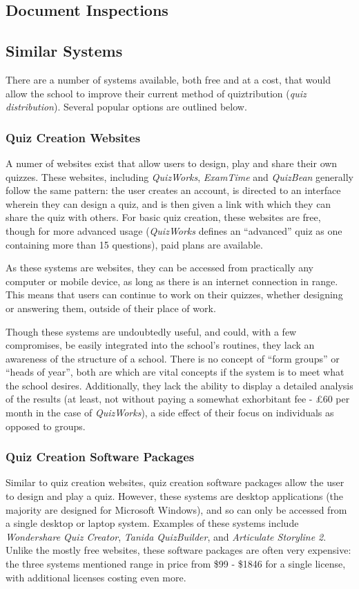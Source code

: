 \subsection{Document Inspections}

\subsection{Similar Systems}
There are a number of systems available, both free and at a cost, that would allow the school to improve their current method of quiztribution (\textit{quiz distribution}). Several popular options are outlined below.

\subsubsection{Quiz Creation Websites}
A numer of websites exist that allow users to design, play and share their own quizzes. These websites, including \textit{QuizWorks}, \textit{ExamTime} and \textit{QuizBean} generally follow the same pattern: the user creates an account, is directed to an interface wherein they can design a quiz, and is then given a link with which they can share the quiz with others. For basic quiz creation, these websites are free, though for more advanced usage (\textit{QuizWorks} defines an ``advanced'' quiz as one containing more than 15 questions), paid plans are available.

As these systems are websites, they can be accessed from practically any computer or mobile device, as long as there is an internet connection in range. This means that users can continue to work on their quizzes, whether designing or answering them, outside of their place of work.

Though these systems are undoubtedly useful, and could, with a few compromises, be easily integrated into the school's routines, they lack an awareness of the structure of a school. There is no concept of ``form groups'' or ``heads of year'', both are which are vital concepts if the system is to meet what the school desires. Additionally, they lack the ability to display a detailed analysis of the results (at least, not without paying a somewhat exhorbitant fee - \pounds60 per month in the case of \textit{QuizWorks}), a side effect of their focus on individuals as opposed to groups.

\subsubsection{Quiz Creation Software Packages}
Similar to quiz creation websites, quiz creation software packages allow the user to design and play a quiz. However, these systems are desktop applications (the majority are designed for Microsoft Windows), and so can only be accessed from a single desktop or laptop system. Examples of these systems include \textit{Wondershare Quiz Creator}, \textit{Tanida QuizBuilder}, and \textit{Articulate Storyline 2}. Unlike the mostly free websites, these software packages are often very expensive: the three systems mentioned range in price from \$99 - \$1846 for a single license, with additional licenses costing even more.

